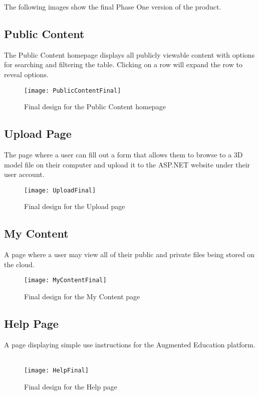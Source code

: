 \hspace{7mm}
The following images show the final Phase One version of the product. 
\subsection{Public Content}
    \hspace{7mm} The Public Content homepage displays all publicly viewable content with options for searching and filtering the table. Clicking on a row will expand the row to reveal options. 
    \label{fig:final_public_content_page}
    \begin{figure}[H]
        \centering \texttt{[image: PublicContentFinal]}
        \caption{Final design for the Public Content homepage}
    \end{figure}

\subsection{Upload Page}
    \hspace{7mm} The page where a user can fill out a form 
    that allows them to browse to a 3D model file on their computer and upload
    it to the ASP.NET website under their user account.
    \ \\
    \label{fig:final_upload_page}
    \begin{figure}[H]
        \centering \texttt{[image: UploadFinal]}
        \caption{Final design for the Upload page}
    \end{figure}

\subsection{My Content}
    \hspace{7mm}
    A page where a user may view all of their public and private files being stored 
    on the cloud.
    \ \\
    \label{fig:final_my_content_page}
    \begin{figure}[H]
        \centering \texttt{[image: MyContentFinal]}
        \caption{Final design for the My Content page}
    \end{figure}

\subsection{Help Page}
    \hspace{7mm}
    A page displaying simple use instructions for the Augmented Education platform. 
    \ \\
    \label{fig:final_help_page}
    \begin{figure}[H]
        \centering \texttt{[image: HelpFinal]}
        \caption{Final design for the Help page}
    \end{figure}
